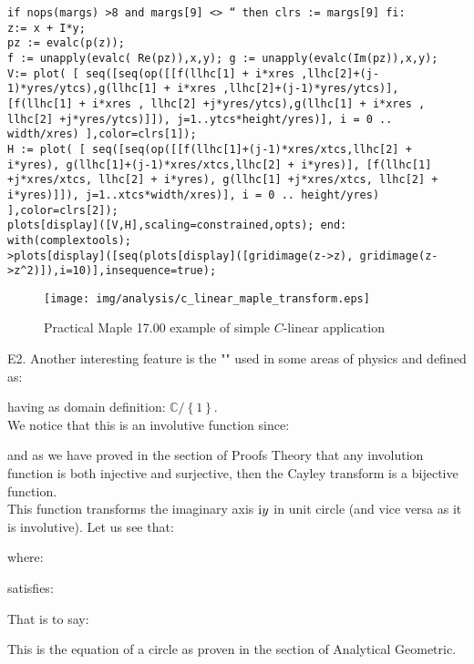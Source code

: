 	\begin{tcolorbox}[colframe=black,colback=white,sharp corners]
\texttt{if nops(margs) >8 and margs[9] <> `` then clrs := margs[9] fi:\\
z:= x + I*y;\\
pz := evalc(p(z));\\
f := unapply(evalc( Re(pz)),x,y); g := unapply(evalc(Im(pz)),x,y);\\
V:= plot( [
seq([seq(op([[f(llhc[1] + i*xres ,llhc[2]+(j-1)*yres/ytcs),g(llhc[1] + i*xres ,llhc[2]+(j-1)*yres/ytcs)], [f(llhc[1] + i*xres , llhc[2] +j*yres/ytcs),g(llhc[1] + i*xres , llhc[2] +j*yres/ytcs)]]),
j=1..ytcs*height/yres)], i = 0 .. width/xres)
],color=clrs[1]);\\
H := plot( [
seq([seq(op([[f(llhc[1]+(j-1)*xres/xtcs,llhc[2] + i*yres),
g(llhc[1]+(j-1)*xres/xtcs,llhc[2] + i*yres)], 
[f(llhc[1] +j*xres/xtcs, llhc[2] + i*yres),
g(llhc[1] +j*xres/xtcs, llhc[2] + i*yres)]]),
j=1..xtcs*width/xres)], i = 0 .. height/yres)
],color=clrs[2]);\\
plots[display]([V,H],scaling=constrained,opts);
end:\\
with(complextools);}\\

\texttt{>plots[display]([seq(plots[display]([gridimage(z->z), gridimage(z->z\string^2)]),i=10)],insequence=true);}
	\begin{figure}[H]
		\begin{center}
			\texttt{[image: img/analysis/c\_linear\_maple\_transform.eps]}
		\end{center}	
		\caption{Practical Maple 17.00 example of simple $C$-linear application}
	\end{figure}
	\end{tcolorbox}
	
	\begin{tcolorbox}[colframe=black,colback=white,sharp corners]
E2. Another interesting feature is the "" used in some areas of physics and defined as:
	
having as domain definition: $\mathbb{C}/\left\lbrace 1\right\rbrace$.\\

	We notice that this is an involutive function since:
	
and as we have proved in the section of Proofs Theory that any involution function is both injective and surjective, then the Cayley transform is a bijective function.\\

This function transforms the imaginary axis $\mathrm{i} y$ in unit circle (and vice versa as it is involutive). Let us see that:
	
where:
	
satisfies:
	
That is to say:
	
This is the equation of a circle as proven in the section of Analytical Geometric.
	\end{tcolorbox}

